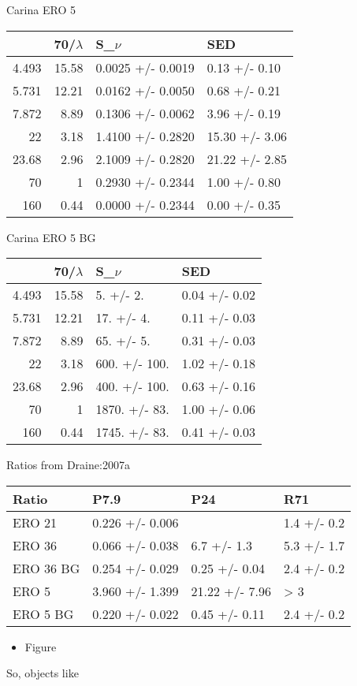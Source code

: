 \documentclass[11pt]{article}
\begin{document}
Carina ERO 5
\begin{center}
\begin{tabular}{rrll}
 & 70/\(\lambda\) & S\_\(\nu\) & SED\\
\hline
4.493 & 15.58 & 0.0025 +/- 0.0019 & 0.13 +/- 0.10\\
5.731 & 12.21 & 0.0162 +/- 0.0050 & 0.68 +/- 0.21\\
7.872 & 8.89 & 0.1306 +/- 0.0062 & 3.96 +/- 0.19\\
22 & 3.18 & 1.4100 +/- 0.2820 & 15.30 +/- 3.06\\
23.68 & 2.96 & 2.1009 +/- 0.2820 & 21.22 +/- 2.85\\
70 & 1 & 0.2930 +/- 0.2344 & 1.00 +/- 0.80\\
160 & 0.44 & 0.0000 +/- 0.2344 & 0.00 +/- 0.35\\
\end{tabular}
\end{center}

Carina ERO 5 BG
\begin{center}
\begin{tabular}{rrll}
 & 70/\(\lambda\) & S\_\(\nu\) & SED\\
\hline
4.493 & 15.58 & 5. +/- 2. & 0.04 +/- 0.02\\
5.731 & 12.21 & 17. +/- 4. & 0.11 +/- 0.03\\
7.872 & 8.89 & 65. +/- 5. & 0.31 +/- 0.03\\
22 & 3.18 & 600. +/- 100. & 1.02 +/- 0.18\\
23.68 & 2.96 & 400. +/- 100. & 0.63 +/- 0.16\\
70 & 1 & 1870. +/- 83. & 1.00 +/- 0.06\\
160 & 0.44 & 1745. +/- 83. & 0.41 +/- 0.03\\
\end{tabular}
\end{center}

Ratios from Draine:2007a
\begin{center}
\begin{tabular}{llll}
Ratio & P7.9 & P24 & R71\\
\hline
ERO 21 & 0.226 +/- 0.006 &  & 1.4 +/- 0.2\\
ERO 36 & 0.066 +/- 0.038 & 6.7 +/- 1.3 & 5.3 +/- 1.7\\
ERO 36 BG & 0.254 +/- 0.029 & 0.25 +/- 0.04 & 2.4 +/- 0.2\\
ERO 5 & 3.960 +/- 1.399 & 21.22 +/- 7.96 & > 3\\
ERO 5 BG & 0.220 +/- 0.022 & 0.45 +/- 0.11 & 2.4 +/- 0.2\\
\end{tabular}
\end{center}

\begin{itemize}
\item Figure
\end{itemize}
So, objects like 
\end{document}
